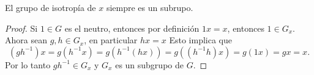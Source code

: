 \begin{ejercicio}\label{ej:29}
  El grupo de isotrop\'ia de $x$ siempre es un subrupo.
\end{ejercicio}
\begin{proof}%
  Si $1\in G$ es el neutro, entonces por definici\'on $1x=x$, entonces $1\in G_x$. Ahora sean
  $g,h\in G_x$, en particular $hx=x$ Esto implica que
  \[
    (g h^{-1})x=g(h^{-1}x)=g(h^{-1}(h x))=g((h^{-1} h)x)=g(1x)=gx=x.
  \]
  Por lo tanto $g h^{-1}\in G_x$ y $G_x$ es un subgrupo de $G$.
  
\end{proof}%

